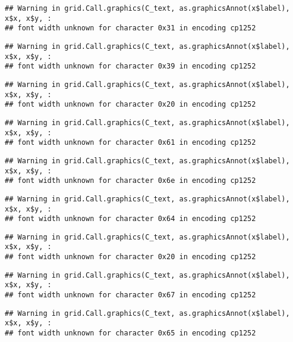 \documentclass[
]{article}
\begin{document}
\begin{verbatim}
## Warning in grid.Call.graphics(C_text, as.graphicsAnnot(x$label), x$x, x$y, :
## font width unknown for character 0x31 in encoding cp1252
\end{verbatim}

\begin{verbatim}
## Warning in grid.Call.graphics(C_text, as.graphicsAnnot(x$label), x$x, x$y, :
## font width unknown for character 0x39 in encoding cp1252
\end{verbatim}

\begin{verbatim}
## Warning in grid.Call.graphics(C_text, as.graphicsAnnot(x$label), x$x, x$y, :
## font width unknown for character 0x20 in encoding cp1252
\end{verbatim}

\begin{verbatim}
## Warning in grid.Call.graphics(C_text, as.graphicsAnnot(x$label), x$x, x$y, :
## font width unknown for character 0x61 in encoding cp1252
\end{verbatim}

\begin{verbatim}
## Warning in grid.Call.graphics(C_text, as.graphicsAnnot(x$label), x$x, x$y, :
## font width unknown for character 0x6e in encoding cp1252
\end{verbatim}

\begin{verbatim}
## Warning in grid.Call.graphics(C_text, as.graphicsAnnot(x$label), x$x, x$y, :
## font width unknown for character 0x64 in encoding cp1252
\end{verbatim}

\begin{verbatim}
## Warning in grid.Call.graphics(C_text, as.graphicsAnnot(x$label), x$x, x$y, :
## font width unknown for character 0x20 in encoding cp1252
\end{verbatim}

\begin{verbatim}
## Warning in grid.Call.graphics(C_text, as.graphicsAnnot(x$label), x$x, x$y, :
## font width unknown for character 0x67 in encoding cp1252
\end{verbatim}

\begin{verbatim}
## Warning in grid.Call.graphics(C_text, as.graphicsAnnot(x$label), x$x, x$y, :
## font width unknown for character 0x65 in encoding cp1252
\end{verbatim}
\end{document}
